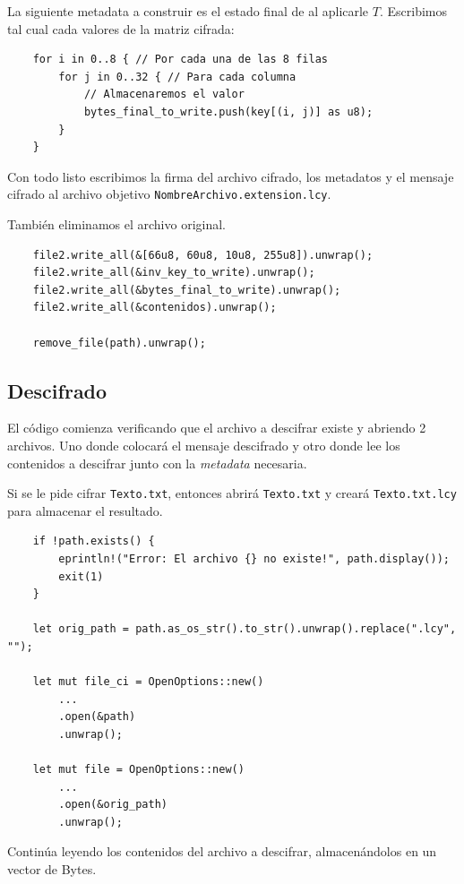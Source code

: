 \documentclass[a4paper]{article}
\begin{document}
La siguiente metadata a construir es el estado final de  al
aplicarle $T$. Escribimos tal cual cada valores de la matriz cifrada:

\begin{verbatim}
    for i in 0..8 { // Por cada una de las 8 filas
        for j in 0..32 { // Para cada columna
            // Almacenaremos el valor
            bytes_final_to_write.push(key[(i, j)] as u8);
        }
    }
\end{verbatim}

Con todo listo escribimos la firma del archivo cifrado, los metadatos y el
mensaje cifrado al archivo objetivo \texttt{NombreArchivo.extension.lcy}.

También eliminamos el archivo original.

\begin{verbatim}
    file2.write_all(&[66u8, 60u8, 10u8, 255u8]).unwrap();
    file2.write_all(&inv_key_to_write).unwrap();
    file2.write_all(&bytes_final_to_write).unwrap();
    file2.write_all(&contenidos).unwrap();

    remove_file(path).unwrap();
\end{verbatim}

\subsection{Descifrado}

El código comienza verificando que el archivo a descifrar existe y abriendo
2
archivos.
Uno
donde
colocará
el
mensaje
descifrado
y
otro donde lee los contenidos a descifrar junto con la \textit{metadata}
necesaria.

Si se le pide cifrar \texttt{Texto.txt}, entonces abrirá \texttt{Texto.txt} y
creará \texttt{Texto.txt.lcy} para almacenar el resultado.

\begin{verbatim}
    if !path.exists() {
        eprintln!("Error: El archivo {} no existe!", path.display());
        exit(1)
    }

    let orig_path = path.as_os_str().to_str().unwrap().replace(".lcy", "");

    let mut file_ci = OpenOptions::new()
        ...
        .open(&path)
        .unwrap();

    let mut file = OpenOptions::new()
        ...
        .open(&orig_path)
        .unwrap();
\end{verbatim}

Continúa leyendo los contenidos del archivo a descifrar, almacenándolos en un
vector de Bytes.
\end{document}
